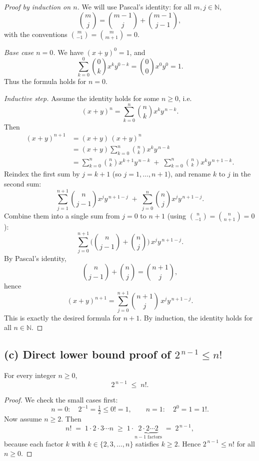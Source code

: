 \documentclass[12pt,a4paper]{article}
\theoremstyle{definition}
\theoremstyle{remark}
\begin{document}
\begin{proof}[Proof by induction on $n$]
We will use Pascal's identity: for all $m,j\in\mathbb{N}$,
\[
\binom{m}{j} = \binom{m-1}{j} + \binom{m-1}{j-1},
\]
with the conventions $\binom{m}{-1}=\binom{m}{m+1}=0$.

\medskip

\emph{Base case $n=0$.} We have $(x+y)^0=1$, and
\[
\sum_{k=0}^{0} \binom{0}{k} x^k y^{0-k} = \binom{0}{0} x^0 y^0 = 1.
\]
Thus the formula holds for $n=0$.

\emph{Inductive step.} Assume the identity holds for some $n\ge 0$, i.e.
\[
(x+y)^n = \sum_{k=0}^{n} \binom{n}{k} x^k y^{\,n-k}.
\]
Then
\[
\begin{aligned}
(x+y)^{n+1}
&= (x+y)\,(x+y)^n \\
&= (x+y)\sum_{k=0}^{n} \binom{n}{k} x^k y^{\,n-k} \\
&= \sum_{k=0}^{n} \binom{n}{k} x^{k+1} y^{\,n-k}
   \;+\; \sum_{k=0}^{n} \binom{n}{k} x^{k} y^{\,n+1-k}.
\end{aligned}
\]
Reindex the first sum by $j=k+1$ (so $j=1,\dots,n+1$), and rename $k$ to $j$ in the second sum:
\[
\sum_{j=1}^{n+1} \binom{n}{j-1} x^{j} y^{\,n+1-j}
\;+\;
\sum_{j=0}^{n} \binom{n}{j} x^{j} y^{\,n+1-j}.
\]
Combine them into a single sum from $j=0$ to $n+1$ (using $\binom{n}{-1}=\binom{n}{n+1}=0$):
\[
\sum_{j=0}^{n+1} \!\Big(\binom{n}{j-1}+\binom{n}{j}\Big)\, x^{j} y^{\,n+1-j}.
\]
By Pascal's identity,
\[
\binom{n}{j-1}+\binom{n}{j}=\binom{n+1}{j},
\]
hence
\[
(x+y)^{n+1}=\sum_{j=0}^{n+1} \binom{n+1}{j}\, x^{j} y^{\,n+1-j}.
\]
This is exactly the desired formula for $n+1$. By induction, the identity holds for all $n\in\mathbb{N}$.
\end{proof}

\subsection*{(c) Direct lower bound proof of $2^{\,n-1}\le n!$}
For every integer $n\ge 0$,
\[
2^{\,n-1}\;\le\; n!.
\]

\begin{proof}
We check the small cases first:
\[
n=0:\quad 2^{-1}=\tfrac12 \le 0!=1,
\qquad
n=1:\quad 2^{0}=1 = 1!.
\]
Now assume $n\ge 2$. Then
\[
n! \;=\; 1\cdot 2 \cdot 3 \cdots n
\;\ge\; 1 \cdot \underbrace{2\cdot 2 \cdots 2}_{\text{$n-1$ factors}}
\;=\; 2^{\,n-1},
\]
because each factor $k$ with $k\in\{2,3,\dots,n\}$ satisfies $k\ge 2$.
Hence $2^{\,n-1}\le n!$ for all $n\ge 0$.
\end{proof}
\end{document}
